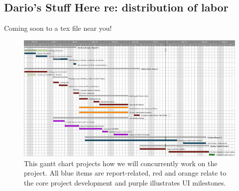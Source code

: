 \subsection{Dario's Stuff Here re: distribution of labor}

Coming soon to a tex file near you!



\hfil\eject \pdfpagewidth=8.5in \pdfpageheight=16in
\begin{figure}
\centering
\includegraphics[width=7in]{./img/gantt.png}
\caption{This gantt chart projects how we will concurrently work on
the project. All blue items are report-related, red and orange relate
to the core project development and purple illustrates UI milestones.}
\end{figure}
%
%
